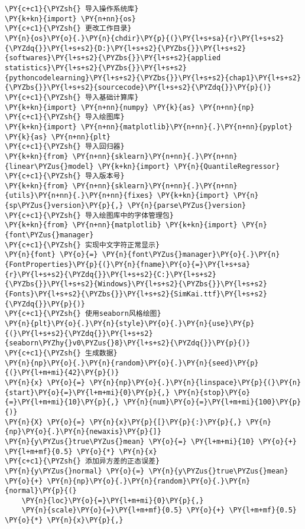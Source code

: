 \begin{Verbatim}[commandchars=\\\{\}]
\PY{c+c1}{\PYZsh{} 导入操作系统库}
\PY{k+kn}{import} \PY{n+nn}{os}
\PY{c+c1}{\PYZsh{} 更改工作目录}
\PY{n}{os}\PY{o}{.}\PY{n}{chdir}\PY{p}{(}\PY{l+s+sa}{r}\PY{l+s+s2}{\PYZdq{}}\PY{l+s+s2}{D:}\PY{l+s+s2}{\PYZbs{}}\PY{l+s+s2}{softwares}\PY{l+s+s2}{\PYZbs{}}\PY{l+s+s2}{applied statistics}\PY{l+s+s2}{\PYZbs{}}\PY{l+s+s2}{pythoncodelearning}\PY{l+s+s2}{\PYZbs{}}\PY{l+s+s2}{chap1}\PY{l+s+s2}{\PYZbs{}}\PY{l+s+s2}{sourcecode}\PY{l+s+s2}{\PYZdq{}}\PY{p}{)}
\PY{c+c1}{\PYZsh{} 导入基础计算库}
\PY{k+kn}{import} \PY{n+nn}{numpy} \PY{k}{as} \PY{n+nn}{np}
\PY{c+c1}{\PYZsh{} 导入绘图库}
\PY{k+kn}{import} \PY{n+nn}{matplotlib}\PY{n+nn}{.}\PY{n+nn}{pyplot} \PY{k}{as} \PY{n+nn}{plt}
\PY{c+c1}{\PYZsh{} 导入回归器}
\PY{k+kn}{from} \PY{n+nn}{sklearn}\PY{n+nn}{.}\PY{n+nn}{linear\PYZus{}model} \PY{k+kn}{import} \PY{n}{QuantileRegressor}
\PY{c+c1}{\PYZsh{} 导入版本号}
\PY{k+kn}{from} \PY{n+nn}{sklearn}\PY{n+nn}{.}\PY{n+nn}{utils}\PY{n+nn}{.}\PY{n+nn}{fixes} \PY{k+kn}{import} \PY{n}{sp\PYZus{}version}\PY{p}{,} \PY{n}{parse\PYZus{}version}
\PY{c+c1}{\PYZsh{} 导入绘图库中的字体管理包}
\PY{k+kn}{from} \PY{n+nn}{matplotlib} \PY{k+kn}{import} \PY{n}{font\PYZus{}manager}
\PY{c+c1}{\PYZsh{} 实现中文字符正常显示}
\PY{n}{font} \PY{o}{=} \PY{n}{font\PYZus{}manager}\PY{o}{.}\PY{n}{FontProperties}\PY{p}{(}\PY{n}{fname}\PY{o}{=}\PY{l+s+sa}{r}\PY{l+s+s2}{\PYZdq{}}\PY{l+s+s2}{C:}\PY{l+s+s2}{\PYZbs{}}\PY{l+s+s2}{Windows}\PY{l+s+s2}{\PYZbs{}}\PY{l+s+s2}{Fonts}\PY{l+s+s2}{\PYZbs{}}\PY{l+s+s2}{SimKai.ttf}\PY{l+s+s2}{\PYZdq{}}\PY{p}{)}
\PY{c+c1}{\PYZsh{} 使用seaborn风格绘图}
\PY{n}{plt}\PY{o}{.}\PY{n}{style}\PY{o}{.}\PY{n}{use}\PY{p}{(}\PY{l+s+s2}{\PYZdq{}}\PY{l+s+s2}{seaborn\PYZhy{}v0\PYZus{}8}\PY{l+s+s2}{\PYZdq{}}\PY{p}{)}
\PY{c+c1}{\PYZsh{} 生成数据}
\PY{n}{np}\PY{o}{.}\PY{n}{random}\PY{o}{.}\PY{n}{seed}\PY{p}{(}\PY{l+m+mi}{42}\PY{p}{)}
\PY{n}{x} \PY{o}{=} \PY{n}{np}\PY{o}{.}\PY{n}{linspace}\PY{p}{(}\PY{n}{start}\PY{o}{=}\PY{l+m+mi}{0}\PY{p}{,} \PY{n}{stop}\PY{o}{=}\PY{l+m+mi}{10}\PY{p}{,} \PY{n}{num}\PY{o}{=}\PY{l+m+mi}{100}\PY{p}{)}
\PY{n}{X} \PY{o}{=} \PY{n}{x}\PY{p}{[}\PY{p}{:}\PY{p}{,} \PY{n}{np}\PY{o}{.}\PY{n}{newaxis}\PY{p}{]}
\PY{n}{y\PYZus{}true\PYZus{}mean} \PY{o}{=} \PY{l+m+mi}{10} \PY{o}{+} \PY{l+m+mf}{0.5} \PY{o}{*} \PY{n}{x}
\PY{c+c1}{\PYZsh{} 添加异方差的正态误差}
\PY{n}{y\PYZus{}normal} \PY{o}{=} \PY{n}{y\PYZus{}true\PYZus{}mean} \PY{o}{+} \PY{n}{np}\PY{o}{.}\PY{n}{random}\PY{o}{.}\PY{n}{normal}\PY{p}{(}
    \PY{n}{loc}\PY{o}{=}\PY{l+m+mi}{0}\PY{p}{,} 
    \PY{n}{scale}\PY{o}{=}\PY{l+m+mf}{0.5} \PY{o}{+} \PY{l+m+mf}{0.5} \PY{o}{*} \PY{n}{x}\PY{p}{,}

\end{Verbatim}
